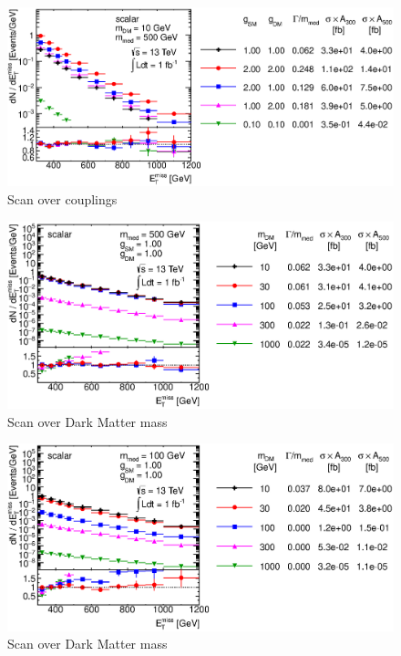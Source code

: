 \begin{figure}
\centering
\includegraphics[width=0.9\linewidth]{figures/monojet/scan_g_S_10_500.eps}
\caption{Scan over couplings}
\label{fig:monojet_scan_S_g}
\end{figure}

\begin{figure}
\centering
\includegraphics[width=0.9\linewidth]{figures/monojet/scan_mDM_S_500.eps}
\caption{Scan over Dark Matter mass}
\label{fig:monojet_scan_S_mDM1000}
\end{figure}

\begin{figure}
\centering
\includegraphics[width=0.9\linewidth]{figures/monojet/scan_mDM_S_100.eps}
\caption{Scan over Dark Matter mass}
\label{fig:monojet_scan_S_mDM100}
\end{figure}

